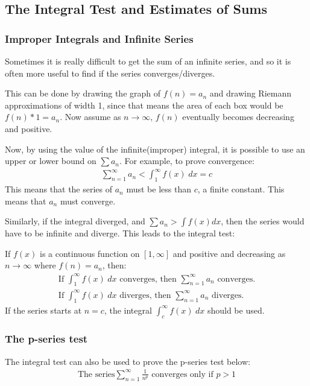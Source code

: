 \documentclass{article}
\begin{document}
\subsection{The Integral Test and Estimates of Sums}
\subsubsection{Improper Integrals and Infinite Series}
Sometimes it is really difficult to get the sum of an infinite series, and so it is often more useful to find if the series converges/diverges.

This can be done by drawing the graph of $f(n) = a_n$ and drawing Riemann approximations of width 1, since that means the area of each box would be $f(n) * 1 = a_n$. Now assume as $n \to \infty$, $f(n)$ eventually becomes decreasing and positive.

Now, by using the value of the infinite(improper) integral, it is possible to use an upper or lower bound on $\sum a_n$. For example, to prove convergence:
\begin{gather*}
    \sum_{n = 1}^\infty a_n < \int_1^\infty f(x)\hspace{3pt}dx = c
\end{gather*}
This means that the series of $a_n$ must be less than $c$, a finite constant. This means that $a_n$ must converge.

Similarly, if the integral diverged, and $\sum a_n > \int f(x) dx$, then the series would have to be infinite and diverge. This leads to the integral test:

If $f(x)$ is a continuous function on $[1,\infty]$ and positive and decreasing as $n \to \infty$ where $f(n) = a_n$, then:
\begin{gather}
    \textrm{If } \int_1^\infty f(x)\hspace{3pt}dx\textrm{ converges, then }\sum_{n=1}^\infty a_n \textrm{ converges.}\\
    \textrm{If } \int_1^\infty f(x)\hspace{3pt}dx\textrm{ diverges, then }\sum_{n=1}^\infty a_n \textrm{ diverges.}
\end{gather}
If the series starts at $n=c$, the integral $\int_c^\infty f(x)\hspace{3pt}dx$ should be used.
\subsubsection{The p-series test}
The integral test can also be used to prove the p-series test below:
\begin{gather*}
    \textrm{The series} \sum_{n=1}^\infty \frac{1}{n^p} \textrm{ converges only if } p > 1
\end{gather*}
\end{document}
